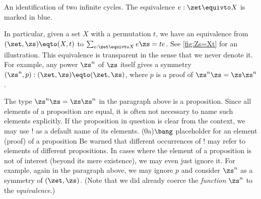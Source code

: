\begin{marginfigure}
  \caption{An identification of two infinite cycles.
    The equivalence $e : \zet \protect\equivto X$ is marked in blue.}\label{fig:Zs=Xt}
\end{marginfigure}
In particular, given a set $X$ with a permutation $t$,
we have an equivalence from $(\zet,\zs)\eqto(X,t)$ to
$\sum_{e:\zet\equivto X}e\zs=te$. See \cref{fig:Zs=Xt} for an illustration.
This equivalence is transparent in the sense that we never denote it.
For example, any power $\zs^n$ of $\zs$ itself gives a symmetry
$(\zs^n,p) : (\zet,\zs)\eqto(\zet,\zs)$, where $p$ is a proof of
$\zs^n \zs = \zs \zs^n$.

\begin{remark}\label{rem:bang}
The type $\zs^n \zs = \zs \zs^n$ in the paragraph above is a proposition.
Since all elements of a proposition are equal, it is often not necessary
to name such elements explicitly. If the proposition in question is clear
from the context, we may use $!$ as a default name of its elements.
\glossary(0a){$\protect\bang$}%
{placeholder for an element (proof) of a proposition}
Be warned that different occurrences of $!$ may refer to elements of
different propositions. In cases where the element of a proposition is
not of interest (beyond its mere existence), we may even just ignore it.
For example, again in the paragraph above, we may ignore $p$ and
consider $\zs^n$ as a symmetry of $(\zet,\zs)$.
(Note that we did already coerce the \emph{function} $\zs^n$ to
the \emph{equivalence}.)
\end{remark}

